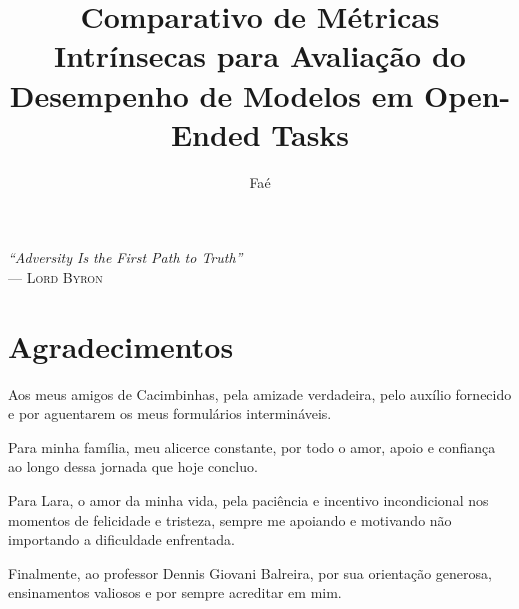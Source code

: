 \documentclass[cic,tc]{iiufrgs}
\title{Comparativo de Métricas Intrínsecas para Avaliação do Desempenho de Modelos em Open-Ended Tasks}
\author{Fa{\'e}}{Eduardo Dalm{\'a}s}
\begin{document}
\maketitle

\clearpage
\begin{flushright}
    \mbox{}\vfill
    {\sffamily\itshape
      ``Adversity Is the First Path to Truth''\\}
    --- \textsc{Lord Byron}
\end{flushright}

\chapter*{Agradecimentos}
Aos meus amigos de Cacimbinhas, pela amizade verdadeira, pelo auxílio fornecido e por aguentarem os meus formulários intermináveis.

Para minha família, meu alicerce constante, por todo o amor, apoio e confiança ao longo dessa jornada que hoje concluo.

Para Lara, o amor da minha vida, pela paciência e incentivo incondicional nos momentos de felicidade e tristeza, sempre me apoiando e motivando não importando a dificuldade enfrentada.

Finalmente, ao professor Dennis Giovani Balreira, por sua orientação generosa, ensinamentos valiosos e por sempre acreditar em mim.
\end{document}
